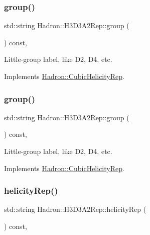 \subsubsection{\texorpdfstring{group()}{group()}\hspace{0.1cm}{\footnotesize\ttfamily [2/3]}}
{\footnotesize\ttfamily std\+::string Hadron\+::\+H3\+D3\+A2\+Rep\+::group (\begin{DoxyParamCaption}{ }\end{DoxyParamCaption}) const\hspace{0.3cm}{\ttfamily [inline]}, {\ttfamily [virtual]}}

Little-\/group label, like D2, D4, etc. 

Implements \mbox{\hyperlink{structHadron_1_1CubicHelicityRep_a101a7d76cd8ccdad0f272db44b766113}{Hadron\+::\+Cubic\+Helicity\+Rep}}.

\mbox{\label{structHadron_1_1H3D3A2Rep_ab7175e896239ed28493bfe574e0b6b9e}} 
\subsubsection{\texorpdfstring{group()}{group()}\hspace{0.1cm}{\footnotesize\ttfamily [3/3]}}
{\footnotesize\ttfamily std\+::string Hadron\+::\+H3\+D3\+A2\+Rep\+::group (\begin{DoxyParamCaption}{ }\end{DoxyParamCaption}) const\hspace{0.3cm}{\ttfamily [inline]}, {\ttfamily [virtual]}}

Little-\/group label, like D2, D4, etc. 

Implements \mbox{\hyperlink{structHadron_1_1CubicHelicityRep_a101a7d76cd8ccdad0f272db44b766113}{Hadron\+::\+Cubic\+Helicity\+Rep}}.

\mbox{\label{structHadron_1_1H3D3A2Rep_adb8dca7dffaed3e2601a160205d6d23c}} 
\subsubsection{\texorpdfstring{helicityRep()}{helicityRep()}\hspace{0.1cm}{\footnotesize\ttfamily [1/2]}}
{\footnotesize\ttfamily std\+::string Hadron\+::\+H3\+D3\+A2\+Rep\+::helicity\+Rep (\begin{DoxyParamCaption}{ }\end{DoxyParamCaption}) const\hspace{0.3cm}{\ttfamily [inline]}, {\ttfamily [virtual]}}

